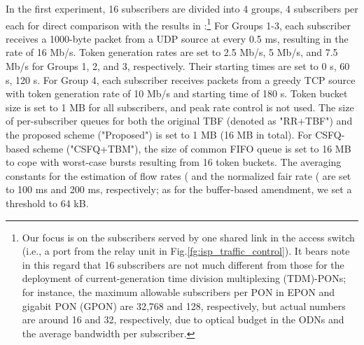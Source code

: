 \documentclass[conference,twoside,final]{IEEEtran}
\begin{document}
In the first experiment, 16 subscribers are divided into 4 groups, 4 subscribers
per each for direct comparison with the results in \cite{Kim:14-1}:\footnote{Our focus is on the subscribers served by one shared link in the access
switch (i.e., a port from the relay unit in
Fig.\ref{fg:isp_traffic_control}). It bears note in this regard that 16
subscribers are not much different from those for the deployment of
current-generation time division multiplexing (TDM)-PONs; for instance, the
maximum allowable subscribers per PON in EPON and gigabit PON (GPON) are 32,768
and 128, respectively, but actual numbers are around 16 and 32, respectively,
due to optical budget in the ODNs and the average bandwidth per subscriber.} For
Groups 1-3, each subscriber receives a 1000-byte packet from a UDP source at
every 0.5 ms, resulting in the rate of 16 Mb/s. Token generation rates are set
to 2.5 Mb/s, 5 Mb/s, and 7.5 Mb/s for Groups 1, 2, and 3, respectively. Their
starting times are set to 0 s, 60 s, 120 s. For Group 4, each subscriber
receives packets from a greedy TCP source with token generation rate of 10 Mb/s
and starting time of 180 s. Token bucket size is set to 1 MB for all
subscribers, and peak rate control is not used. The size of per-subscriber
queues for both the original TBF (denoted as "RR+TBF") and the proposed scheme
("Proposed") is set to 1 MB (16 MB in total). For CSFQ-based scheme
("CSFQ+TBM"), the size of common FIFO queue is set to 16 MB to cope with
worst-case bursts resulting from 16 token buckets. The averaging constants for
the estimation of flow rates ( and the normalized fair rate
( are set to 100 ms and 200 ms, respectively; as for the
buffer-based amendment, we set a threshold to 64 kB.
\end{document}

